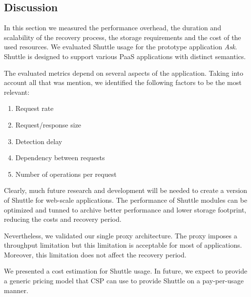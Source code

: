 \subsection{Discussion}\label{sec:eval:performance:discussion}
In this section we measured the performance overhead, the duration and scalability of the recovery process, the storage requirements and the cost of the used resources. We evaluated Shuttle usage for the prototype application \emph{Ask}. Shuttle is designed to support various \ac{PaaS} applications with distinct semantics.

The evaluated metrics depend on several aspects of the application. Taking into account all that was mention, we identified the following factors to be the most relevant:

\begin{enumerate}
  \item Request rate
  \item Request/response size
  \item Detection delay
  \item Dependency between requests   
  \item Number of operations per request
\end{enumerate}                              

Clearly, much future research and development will be needed to create a version of Shuttle for web-scale applications. The performance of Shuttle modules can be optimized and tunned to archive better performance and lower storage footprint, reducing the costs and recovery period.

Nevertheless, we validated our single proxy architecture. The proxy imposes a throughput limitation but this limitation is acceptable for most of applications. Moreover, this limitation does not affect the recovery period.

We presented a cost estimation for Shuttle usage. In future, we expect to provide a generic pricing model that \ac{CSP} can use to provide Shuttle on a pay-per-usage manner.


